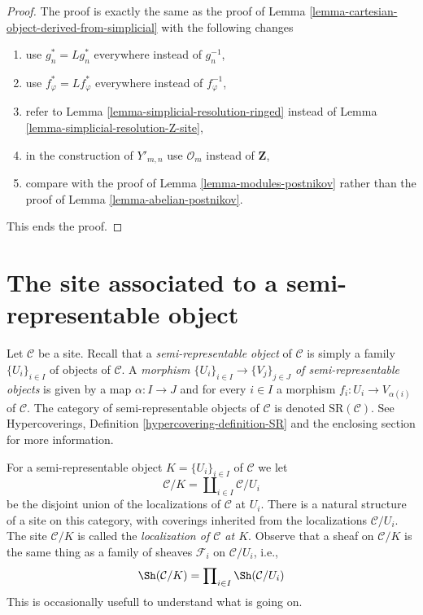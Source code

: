 \begin{proof}
The proof is exactly the same as the proof of
Lemma \ref{lemma-cartesian-object-derived-from-simplicial}
with the following changes
\begin{enumerate}
\item use $g_n^* = Lg_n^*$ everywhere instead of $g_n^{-1}$,
\item use $f_\varphi^* = Lf_\varphi^*$ everywhere instead of $f_\varphi^{-1}$,
\item refer to Lemma \ref{lemma-simplicial-resolution-ringed}
instead of Lemma \ref{lemma-simplicial-resolution-Z-site},
\item in the construction of $Y'_{m, n}$ use
$\mathcal{O}_m$ instead of $\mathbf{Z}$,
\item compare with the proof of Lemma \ref{lemma-modules-postnikov}
rather than the proof of Lemma \ref{lemma-abelian-postnikov}.
\end{enumerate}
This ends the proof.
\end{proof}







\section{The site associated to a semi-representable object}
\label{section-semi-representable}

\noindent
Let $\mathcal{C}$ be a site. Recall that a {\it semi-representable object}
of $\mathcal{C}$ is simply a family $\{U_i\}_{i \in I}$
of objects of $\mathcal{C}$. A
{\it morphism $\{U_i\}_{i \in I} \to \{V_j\}_{j \in J}$ of
semi-representable objects} is given by a map $\alpha : I \to J$
and for every $i \in I$ a morphism $f_i : U_i \to V_{\alpha(i)}$
of $\mathcal{C}$.
The category of semi-representable objects of $\mathcal{C}$
is denoted $\text{SR}(\mathcal{C})$.
See Hypercoverings, Definition \ref{hypercovering-definition-SR}
and the enclosing section for more information.

\medskip\noindent
For a semi-representable object $K = \{U_i\}_{i \in I}$ of $\mathcal{C}$
we let
$$
\mathcal{C}/K = \coprod\nolimits_{i \in I} \mathcal{C}/U_i
$$
be the disjoint union of the localizations of $\mathcal{C}$ at $U_i$.
There is a natural structure of a site on this category, with
coverings inherited from the localizations $\mathcal{C}/U_i$.
The site $\mathcal{C}/K$ is called the
{\it localization of $\mathcal{C}$ at $K$}.
Observe that a sheaf on $\mathcal{C}/K$ is the same thing as
a family of sheaves $\mathcal{F}_i$ on $\mathcal{C}/U_i$, i.e.,
$$
\Sh(\mathcal{C}/K) = \prod\nolimits_{i \in I} \Sh(\mathcal{C}/U_i)
$$
This is occasionally usefull to understand what is going on.

